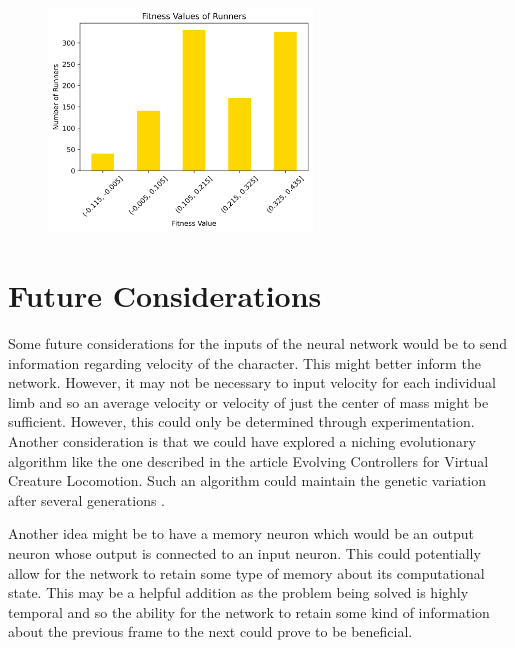 \documentclass[letterpaper]{article} %
\begin{document}
\begin{figure}[h]
\centering
\includegraphics[width=7cm]{fitness_dist.png}
\end{figure}

\section{Future Considerations}

Some future considerations for the inputs of the neural network would be to send information regarding velocity of the character. This might better inform the network. However, it may not be necessary to input velocity for each individual limb and so an average velocity or velocity of just the center of mass might be sufficient. However, this could only be determined through experimentation. Another consideration is that we could have explored a niching evolutionary algorithm like the one described in the article Evolving Controllers for Virtual Creature Locomotion. Such an algorithm could maintain the genetic variation after several generations \cite{sanders_lobb_riddle_2003}.  

\par Another idea might be to have a memory neuron which would be an output neuron whose output is connected to an input neuron. This could potentially allow for the network to retain some type of memory about its computational state. This may be a helpful addition as the problem being solved is highly temporal and so the ability for the network to retain some kind of information about the previous frame to the next could prove to be beneficial.


\end{document}
